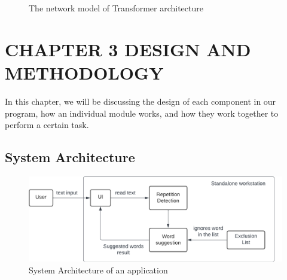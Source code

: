 \documentclass[12pt,oneside,openright,a4paper]{cpe-english-project}
\begin{document}
 
\begin{figure}[!h]\centering
\setlength{\fboxrule}{0.2mm} %
\setlength{\fboxsep}{1cm}
\caption{The network model of Transformer architecture}\label{fig:model2}
\end{figure}


\chapter{CHAPTER 3 DESIGN AND METHODOLOGY}
In this chapter, we will be discussing the design of each component in our program, how an individual module works, and how they work together to perform a certain task.

\section{System Architecture}
\begin{figure}[!h]\centering
\includegraphics[width=15cm]{./img/chp3/SysArch.png}
\caption{System Architecture of an application}\label{fig:sysarch}
\end{figure}
\end{document}
